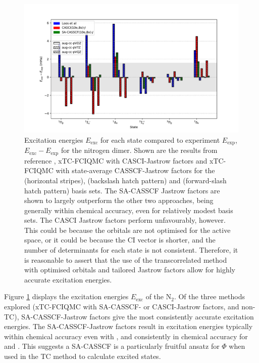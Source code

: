 \begin{figure}[htbp]
    \centering
    \includegraphics[width=\textwidth]{figures/binding/n2_exc}
    \caption{Excitation energies $E_\mathrm{exc}$ for each state compared to experiment $E_\mathrm{exp}$,\supercite{oddershedeComparison1985,huberConstants1979} $E_\mathrm{exc}-E_\mathrm{exp}$ for the nitrogen dimer. Shown are the results from reference , xTC-FCIQMC with CASCI-Jastrow factors and xTC-FCIQMC with state-average CASSCF-Jastrow factors for the \avdz (horizontal stripes), \avtz (backslash hatch pattern) and \avqz (forward-slash hatch pattern) basis sets. The SA-CASSCF Jastrow factors are shown to largely outperform the other two approaches, being generally within chemical accuracy, even for relatively modest basis sets. The CASCI Jastrow factors perform unfavourably, however. This could be because the orbitals are not optimised for the active space, or it could be because the CI vector is shorter, and the number of determinants for each state is not consistent. Therefore, it is reasonable to assert that the use of the transcorrelated method with optimised orbitals and tailored Jastrow factors allow for highly accurate excitation energies.
        }
    \label{fig:n2-excite-relative}
\end{figure}

Figure \ref{fig:n2-excite-relative} displays the excitation energies $E_\mathrm{exc}$ of the N$_2$. Of the three methods explored (xTC-FCIQMC with SA-CASSCF- or CASCI-Jastrow factors, and non-TC), SA-CASSCF-Jastrow factors give the most consistently accurate excitation energies. The SA-CASSCF-Jastrow factors result in excitation energies typically within chemical accuracy even with \avdz, and consistently in chemical accuracy for \avtz and \avqz. This suggests a SA-CASSCF is a particularly fruitful ansatz for $\Phi$ when used in the TC method to calculate excited states.

